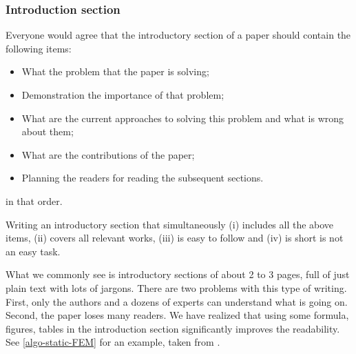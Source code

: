 \documentclass[authoryear,3p,times,preprint,review,fleqn]{elsarticle}
\numberwithin{equation}{section}
\theoremstyle{remark}
\begin{document}
\subsubsection{Introduction section}\label{sec:introduction-part}

Everyone would agree that the introductory section of a paper should contain the following items:

\begin{itemize}
\item What the problem that the paper is solving;
\item Demonstration the importance of that problem;
\item What are the current approaches to solving this problem and what is wrong about them;
\item What are the contributions of the paper; 
\item Planning  the readers for reading the subsequent sections.
\end{itemize}
in that order.

Writing an introductory section that simultaneously (i) includes all the above items, (ii) covers all relevant works, (iii) is easy to follow and (iv) is short is not an easy task.

What we commonly see is introductory sections of about 2 to 3 pages, full of just plain text with lots of jargons. There are two problems with this type of writing. First, only the authors and a dozens of experts can understand what is going on. Second, the paper loses many readers. We have realized that using some formula, figures, tables in the introduction section significantly improves the readability.
See \cref{algo-static-FEM} for an example, taken from \cite{Mandal:EFM2019}.
\end{document}
